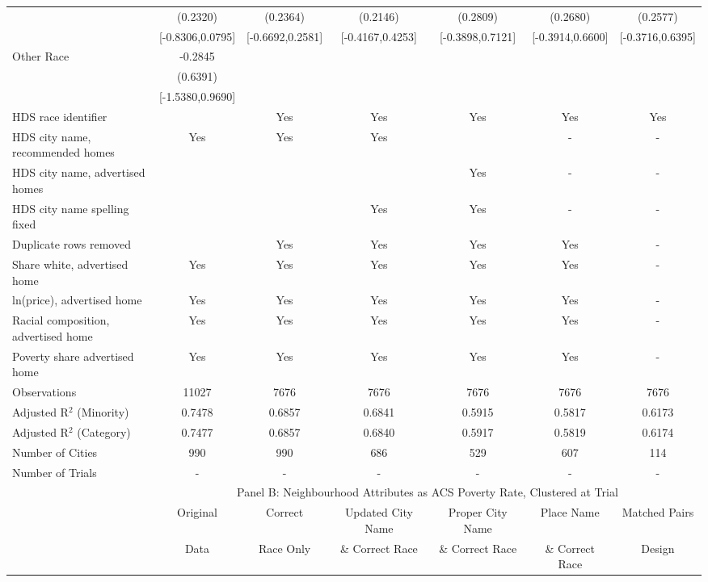 \begin{table}[htbp]
{\begin{tabular}{l*{6}{c}}
 & (0.2320) & (0.2364) & (0.2146) & (0.2809) & (0.2680) & (0.2577) \\
 & [-0.8306,0.0795] & [-0.6692,0.2581] & [-0.4167,0.4253] & [-0.3898,0.7121] & [-0.3914,0.6600] & [-0.3716,0.6395] \\
Other Race & -0.2845 &  &  &  &  &  \\
 & (0.6391) &  &  &  &  &  \\
 & [-1.5380,0.9690] &  &  &  &  &  \\
\midrule
HDS race identifier & & Yes & Yes & Yes & Yes & Yes \\
HDS city name, recommended homes & Yes & Yes & Yes & & - & -\\
HDS city name, advertised homes &  &  &  & Yes & - & -\\
HDS city name spelling fixed & & & Yes & Yes & - & -\\
Duplicate rows removed &  & Yes & Yes & Yes & Yes & - \\
\midrule
Share white, advertised home  & Yes & Yes & Yes & Yes & Yes & - \\
ln(price), advertised home  & Yes & Yes & Yes & Yes & Yes & - \\
Racial composition, advertised home & Yes & Yes & Yes & Yes & Yes & - \\
Poverty share advertised home & Yes & Yes & Yes & Yes & Yes & - \\
Observations & 11027 & 7676 & 7676 & 7676 & 7676 & 7676 \\
Adjusted R$^2$ (Minority) & 0.7478 & 0.6857 & 0.6841 & 0.5915 & 0.5817 & 0.6173 \\
Adjusted R$^2$ (Category) & 0.7477 & 0.6857 & 0.6840 & 0.5917 & 0.5819 & 0.6174 \\
Number of Cities & 990 & 990 & 686 & 529 & 607 & 114 \\
Number of Trials & - & - & - & - & - & - \\
\bottomrule
\toprule
& \multicolumn{6}{c}{Panel B: Neighbourhood Attributes as ACS Poverty Rate, Clustered at Trial}\\
\toprule
                    &\multicolumn{1}{c}{Original}&\multicolumn{1}{c}{Correct}&\multicolumn{1}{c}{Updated City Name}&\multicolumn{1}{c}{Proper City Name}&\multicolumn{1}{c}{Place Name}&\multicolumn{1}{c}{Matched Pairs}\\
                      &\multicolumn{1}{c}{Data}&\multicolumn{1}{c}{Race Only}&\multicolumn{1}{c}{\& Correct Race}&\multicolumn{1}{c}{\& Correct Race}&\multicolumn{1}{c}{\& Correct Race}&\multicolumn{1}{c}{Design}\\                  

\end{tabular}}
\end{table}
